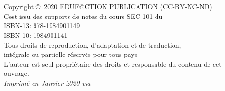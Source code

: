 
\newpage

~\vfill
\thispagestyle{empty}

\noindent {\Huge\ccbyncndeu}\\ 


\noindent Copyright \copyright\ 2020 EDUF@CTION PUBLICATION (CC-BY-NC-ND)\\ %

\noindent C\edoc est issu des supports de notes du cours SEC 101 du \uCnam \\
ISBN-13: 978-1984901149 \\
ISBN-10: 1984901141 \\
Tous droits de reproduction, d’adaptation et de traduction,\\
intégrale ou partielle réservés pour tous pays.\\
L’auteur est seul propriétaire des droits et responsable du contenu de cet ouvrage.\\

\noindent \textit{Imprimé en Janvier 2020 via \printer} %